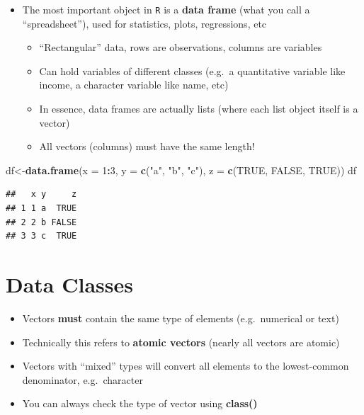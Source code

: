 \documentclass[]{book}
\newenvironment{Shaded}{\begin{snugshade}}{\end{snugshade}}
\newcommand{\KeywordTok}[1]{\textcolor[rgb]{0.13,0.29,0.53}{\textbf{#1}}}
\newcommand{\DataTypeTok}[1]{\textcolor[rgb]{0.13,0.29,0.53}{#1}}
\newcommand{\DecValTok}[1]{\textcolor[rgb]{0.00,0.00,0.81}{#1}}
\newcommand{\StringTok}[1]{\textcolor[rgb]{0.31,0.60,0.02}{#1}}
\newcommand{\OtherTok}[1]{\textcolor[rgb]{0.56,0.35,0.01}{#1}}
\newcommand{\OperatorTok}[1]{\textcolor[rgb]{0.81,0.36,0.00}{\textbf{#1}}}
\newcommand{\NormalTok}[1]{#1}
\providecommand{\tightlist}{%
  \setlength{\itemsep}{0pt}\setlength{\parskip}{0pt}}
\theoremstyle{definition}
\theoremstyle{definition}
\theoremstyle{definition}
\theoremstyle{remark}
\begin{document}
\begin{itemize}
\tightlist
\item
  The most important object in \texttt{R} is a \textbf{data frame} (what
  you call a ``spreadsheet''), used for statistics, plots, regressions,
  etc

  \begin{itemize}
  \tightlist
  \item
    ``Rectangular'' data, rows are observations, columns are variables
  \item
    Can hold variables of different classes (e.g.~a quantitative
    variable like income, a character variable like name, etc)
  \item
    In essence, data frames are actually lists (where each list object
    itself is a vector)
  \item
    All vectors (columns) must have the same length!
  \end{itemize}
\end{itemize}

\begin{Shaded}
\begin{Highlighting}[]
\NormalTok{df<-}\KeywordTok{data.frame}\NormalTok{(}\DataTypeTok{x =} \DecValTok{1}\OperatorTok{:}\DecValTok{3}\NormalTok{,}
           \DataTypeTok{y =} \KeywordTok{c}\NormalTok{(}\StringTok{"a"}\NormalTok{, }\StringTok{"b"}\NormalTok{, }\StringTok{"c"}\NormalTok{),}
           \DataTypeTok{z =} \KeywordTok{c}\NormalTok{(}\OtherTok{TRUE}\NormalTok{, }\OtherTok{FALSE}\NormalTok{, }\OtherTok{TRUE}\NormalTok{))}
\NormalTok{df}
\end{Highlighting}
\end{Shaded}

\begin{verbatim}
##   x y     z
## 1 1 a  TRUE
## 2 2 b FALSE
## 3 3 c  TRUE
\end{verbatim}

\section{Data Classes}\label{data-classes}

\begin{itemize}
\tightlist
\item
  Vectors \textbf{must} contain the same type of elements
  (e.g.~numerical or text)
\item
  Technically this refers to \textbf{atomic vectors} (nearly all vectors
  are atomic)
\item
  Vectors with ``mixed'' types will convert all elements to the
  lowest-common denominator, e.g.~character
\item
  You can always check the type of vector using \textbf{class()}
\end{itemize}
\end{document}
